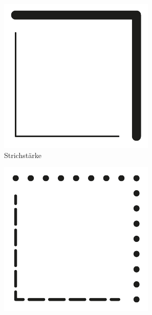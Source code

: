 \begin{figure}[h!tbp]
\centering
\begin{subfigure}{.25\textwidth}
  \centering
  \includegraphics[width=\linewidth]{bilder/vektor_pfadLayoutattributeA.pdf}
  \caption*{Strichstärke}
\end{subfigure}%
\begin{subfigure}{.25\textwidth}
  \centering
  \includegraphics[width=\linewidth]{bilder/vektor_pfadLayoutattributeB.pdf}

\end{subfigure}
\end{figure}
